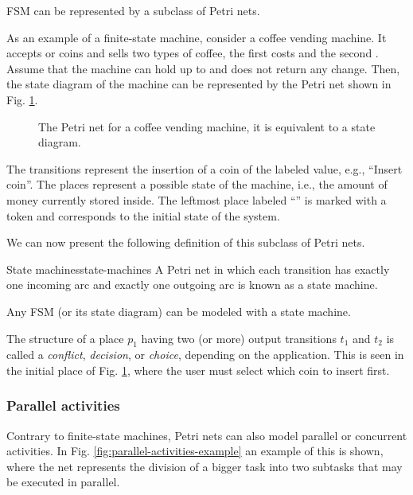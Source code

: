 \acrfull{FSM} can be represented by a subclass of Petri nets.

As an example of a finite-state machine, consider a coffee vending machine.
It accepts  or  coins and sells two types of coffee,
the first costs  and the second .
Assume that the machine can hold up to  and does not return any change.
Then, the state diagram of the machine can be represented
by the Petri net shown in Fig. \ref{fig:state-machine-example}.

\begin{figure}[!htb]
      \centering
      
      \caption{The Petri net for a coffee vending machine, it is equivalent to a state diagram.}
      \label{fig:state-machine-example}
\end{figure}

The transitions represent the insertion of a coin of the labeled value,
e.g., ``Insert  coin''.
The places represent a possible state of the machine,
i.e., the amount of money currently stored inside.
The leftmost place labeled ``'' is marked with a token
and corresponds to the initial state of the system.

We can now present the following definition of this subclass of Petri nets.

\begin{definition}{State machines}{state-machines}
      A Petri net in which each transition has exactly one incoming arc
      and exactly one outgoing arc is known as a state machine.

      Any \acrshort{FSM} (or its state diagram) can be modeled with a state machine.
\end{definition}

The structure of a place $p_1$ having two (or more) output transitions $t_1$ and $t_2$ is called
a \emph{conflict}, \emph{decision}, or \emph{choice}, depending on the application.
This is seen in the initial place of Fig. \ref{fig:state-machine-example},
where the user must select which coin to insert first.

\subsubsection{Parallel activities}

Contrary to finite-state machines, Petri nets can also model parallel or concurrent activities.
In Fig. \ref{fig:parallel-activities-example} an example of this is shown,
where the net represents the division of a bigger task
into two subtasks that may be executed in parallel.

